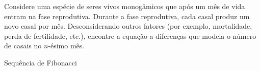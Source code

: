 \begin{exer}
  Considere uma espécie de seres vivos monogâmicos que após um mês de vida entram na fase reprodutiva. Durante a fase reprodutiva, cada casal produz um novo casal por mês. Desconsiderando outros fatores (por exemplo, mortalidade, perda de fertilidade, etc.), encontre a equação a diferenças que modela o número de casais no $n$-ésimo mês. 
\end{exer}
\begin{resp}
  Sequência de Fibonacci
\end{resp}
